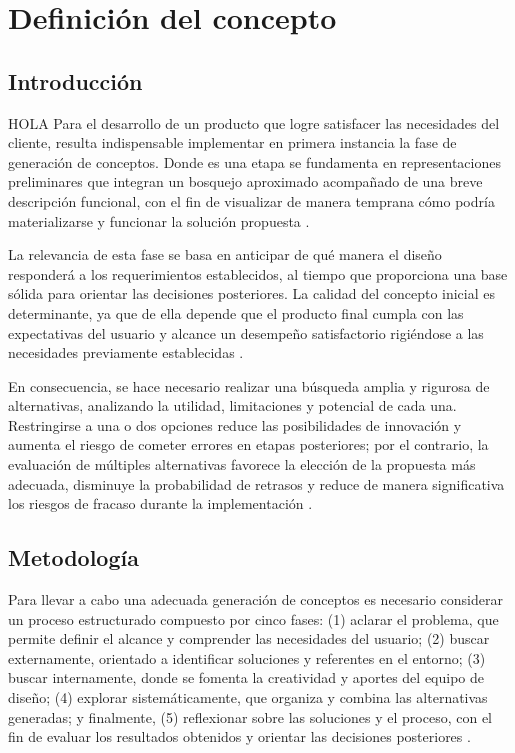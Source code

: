 \documentclass[../../DocumentoCompleto.tex]{subfiles}
\begin{document}
\chapter{Definición del concepto}
\section{Introducción}
HOLA
Para el desarrollo de un producto que logre satisfacer las necesidades del cliente, resulta indispensable implementar en primera instancia la fase de generación de conceptos. Donde es una etapa se fundamenta en representaciones preliminares que integran un bosquejo aproximado acompañado de una breve descripción funcional, con el fin de visualizar de manera temprana cómo podría materializarse y funcionar la solución propuesta \parencite[120]{Ulrich2020}.

La relevancia de esta fase se basa en anticipar de qué manera el diseño responderá a los requerimientos establecidos, al tiempo que proporciona una base sólida para orientar las decisiones posteriores. La calidad del concepto inicial es determinante, ya que de ella depende que el producto final cumpla con las expectativas del usuario y alcance un desempeño satisfactorio rigiéndose a las necesidades previamente establecidas \parencite[120]{Ulrich2020}.

En consecuencia, se hace necesario realizar una búsqueda amplia y rigurosa de alternativas, analizando la utilidad, limitaciones y potencial de cada una. Restringirse a una o dos opciones reduce las posibilidades de innovación y aumenta el riesgo de cometer errores en etapas posteriores; por el contrario, la evaluación de múltiples alternativas favorece la elección de la propuesta más adecuada, disminuye la probabilidad de retrasos y reduce de manera significativa los riesgos de fracaso durante la implementación \parencite[120]{Ulrich2020}.


\section{Metodología}

Para llevar a cabo una adecuada generación de conceptos es necesario considerar un proceso estructurado compuesto por cinco fases: (1) aclarar el problema, que permite definir el alcance y comprender las necesidades del usuario; (2) buscar externamente, orientado a identificar soluciones y referentes en el entorno;  (3) buscar internamente, donde se fomenta la creatividad y aportes del equipo de diseño; (4) explorar sistemáticamente, que organiza y combina las alternativas generadas; y finalmente, (5) reflexionar sobre las soluciones y el proceso, con el fin de evaluar los resultados obtenidos y orientar las decisiones posteriores \parencite[126]{Ulrich2020}.
\end{document}
